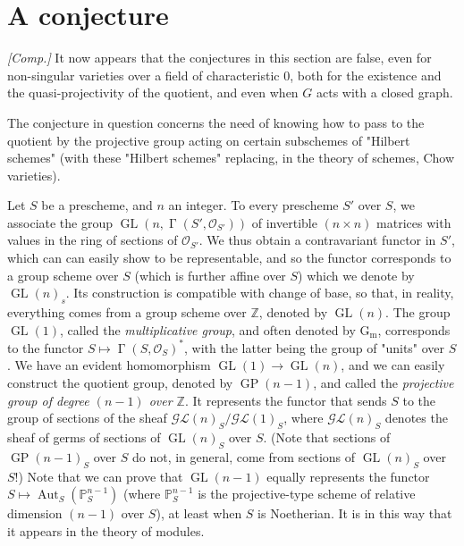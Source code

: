 \section{A conjecture}\label{fga3.iii-8}


\begin{remark}\label{fga3.iii-8-remark-i}
    \emph{[Comp.]}
    It now appears that the conjectures in this section are false, even for non-singular varieties over a field of characteristic $0$, both for the existence and the quasi-projectivity of the quotient, and even when $G$ acts with a closed graph.
\end{remark}


The conjecture in question concerns the need of knowing how to pass to the quotient by the projective group acting on certain subschemes of "Hilbert schemes" (with these "Hilbert schemes" replacing, in the theory of schemes, Chow varieties).


Let $S$ be a prescheme, and $n$ an integer.
To every prescheme $S'$ over $S$, we associate the group $\operatorname{GL}(n,\operatorname{\Gamma}(S',\mathcal{O}_{S'}))$ of invertible $(n\times n)$ matrices with values in the ring of sections of $\mathcal{O}_{S'}$.
We thus obtain a contravariant functor in $S'$, which can can easily show to be representable, and so the functor corresponds to a group scheme over $S$ (which is further affine over $S$) which we denote by $\operatorname{GL}(n)_s$.
Its construction is compatible with change of base, so that, in reality, everything comes from a group scheme over $\mathbb{Z}$, denoted by $\operatorname{GL}(n)$.
The group $\operatorname{GL}(1)$, called the \emph{multiplicative group}, and often denoted by $\operatorname{G_m}$, corresponds to the functor $S\mapsto\operatorname{\Gamma}(S,\mathcal{O}_S)^*$, with the latter being the group of "units" over $S$.
We have an evident homomorphism $\operatorname{GL}(1)\to\operatorname{GL}(n)$, and we can easily construct the quotient group, denoted by $\operatorname{GP}(n-1)$, and called the \emph{projective group of degree $(n-1)$ over $\mathbb{Z}$}.
It represents the functor that sends $S$ to the group of sections of the sheaf $\mathcal{GL}(n)_S/\mathcal{GL}(1)_S$, where $\mathcal{GL}(n)_S$ denotes the sheaf of germs of sections of $\operatorname{GL}(n)_S$ over $S$.
(Note that sections of $\operatorname{GP}(n-1)_S$ over $S$ do not, in general, come from sections of $\operatorname{GL}(n)_S$ over $S$!)
Note that we can prove that $\operatorname{GL}(n-1)$ equally represents the functor $S\mapsto\operatorname{Aut}_S(\mathbb{P}_S^{n-1})$ (where $\mathbb{P}_S^{n-1}$ is the projective-type scheme of relative dimension $(n-1)$ over $S$), at least when $S$ is Noetherian.
It is in this way that it appears in the theory of modules.



